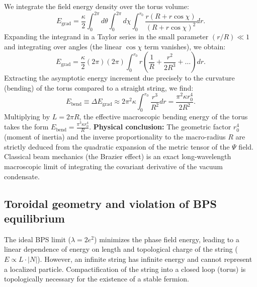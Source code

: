 \documentclass[11pt,a4paper]{article}
\begin{document}
We integrate the field energy density over the torus volume:
\begin{equation}
E_{\text{grad}} = \frac{\kappa}{2} \int_0^{2\pi} d\theta \int_0^{2\pi} d\chi \int_0^{r_0} \frac{r(R + r\cos\chi)}{(R + r\cos\chi)^2} dr.
\end{equation}
Expanding the integrand in a Taylor series in the small parameter $(r/R) \ll 1$ and integrating over angles (the linear $\cos\chi$ term vanishes), we obtain:
\begin{equation}
E_{\text{grad}} = \frac{\kappa}{2} (2\pi) (2\pi) \int_0^{r_0} r \left( \frac{1}{R} + \frac{r^2}{2R^3} + \dots \right) dr.
\end{equation}
Extracting the asymptotic energy increment due precisely to the curvature (bending) of the torus compared to a straight string, we find:
\begin{equation}
E_{\text{bend}} \equiv \Delta E_{\text{grad}} \approx 2\pi^2 \kappa \int_0^{r_0} \frac{r^3}{R^2} dr = \frac{\pi^2 \kappa r_0^4}{2 R^2}.
\label{eq:field_to_mechanics}
\end{equation}
Multiplying by $L = 2\pi R$, the effective macroscopic bending energy of the torus takes the form $E_{\text{bend}} = \frac{\pi^3 \kappa r_0^4}{R}$.
\textbf{Physical conclusion:} The geometric factor $r_0^4$ (moment of inertia) and the inverse proportionality to the macro-radius $R$ are strictly deduced from the quadratic expansion of the metric tensor of the $\Psi$ field. Classical beam mechanics (the Brazier effect) is an exact long-wavelength macroscopic limit of integrating the covariant derivative of the vacuum condensate.
	
\subsection{Toroidal geometry and violation of BPS equilibrium}
The ideal BPS limit ($\lambda = 2e^2$) minimizes the phase field energy, leading to a linear dependence of energy on length and topological charge of the string ($E \propto L \cdot |N|$). However, an infinite string has infinite energy and cannot represent a localized particle. Compactification of the string into a closed loop (torus) is topologically necessary for the existence of a stable fermion.
	
\end{document}

